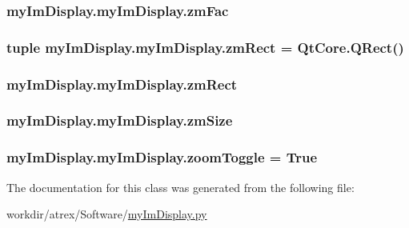\hypertarget{classmy_im_display_1_1my_im_display_a9aca945926bdc3f037ba0cc3b155b1a8}{
\subsubsection[{zm\-Fac}]{\setlength{\rightskip}{0pt plus 5cm}my\-Im\-Display.\-my\-Im\-Display.\-zm\-Fac}}\label{classmy_im_display_1_1my_im_display_a9aca945926bdc3f037ba0cc3b155b1a8}
\hypertarget{classmy_im_display_1_1my_im_display_a02f7742e2c4e540f6585f39c8af717cb}{
\subsubsection[{zm\-Rect}]{\setlength{\rightskip}{0pt plus 5cm}tuple my\-Im\-Display.\-my\-Im\-Display.\-zm\-Rect = Qt\-Core.\-Q\-Rect()\hspace{0.3cm}{\ttfamily [static]}}}\label{classmy_im_display_1_1my_im_display_a02f7742e2c4e540f6585f39c8af717cb}
\hypertarget{classmy_im_display_1_1my_im_display_a2fef2a841184ea3d06026f30fedb9c68}{
\subsubsection[{zm\-Rect}]{\setlength{\rightskip}{0pt plus 5cm}my\-Im\-Display.\-my\-Im\-Display.\-zm\-Rect}}\label{classmy_im_display_1_1my_im_display_a2fef2a841184ea3d06026f30fedb9c68}
\hypertarget{classmy_im_display_1_1my_im_display_ad52cc4c765b66c9200b3d3fbf8415170}{
\subsubsection[{zm\-Size}]{\setlength{\rightskip}{0pt plus 5cm}my\-Im\-Display.\-my\-Im\-Display.\-zm\-Size}}\label{classmy_im_display_1_1my_im_display_ad52cc4c765b66c9200b3d3fbf8415170}
\hypertarget{classmy_im_display_1_1my_im_display_a1ede5c771d24ccc9bc28d13b9af5aea9}{
\subsubsection[{zoom\-Toggle}]{\setlength{\rightskip}{0pt plus 5cm}my\-Im\-Display.\-my\-Im\-Display.\-zoom\-Toggle = True\hspace{0.3cm}{\ttfamily [static]}}}\label{classmy_im_display_1_1my_im_display_a1ede5c771d24ccc9bc28d13b9af5aea9}


The documentation for this class was generated from the following file\-:\begin{DoxyCompactItemize}
\item 
workdir/atrex/\-Software/\hyperlink{my_im_display_8py}{my\-Im\-Display.\-py}\end{DoxyCompactItemize}
